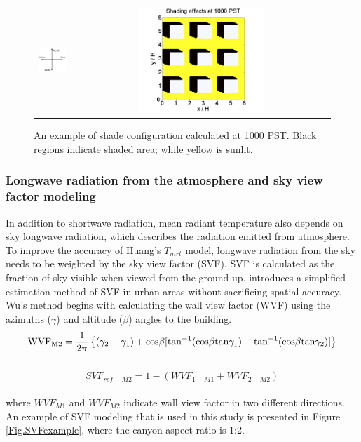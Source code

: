 \documentclass[smallextended]{svjour3}
\begin{document}
\begin{figure}[!h]
\graphicspath{ {image/} }
\begin{tabular}{cc}
   \includegraphics[width=1in]{ESWN.JPG} & \includegraphics[width=0.5\textwidth]{ShadowSample.png}  
\end{tabular}
\caption{An example of shade configuration calculated at 1000 PST. Black regions indicate shaded area; while yellow is sunlit.}
\label{Fig.ShadowExample}
\end{figure}

\subsubsection{Longwave radiation from the atmosphere and sky view factor modeling}
In addition to shortwave radiation, mean radiant temperature also depends on sky longwave radiation, which describes the radiation emitted from atmosphere. To improve the accuracy of Huang's $T_{mrt}$ model, longwave radiation from the sky needs to be weighted by the sky view factor (SVF). SVF is calculated as the fraction of sky visible when viewed from the ground up.  \cite{wu2013calculation} introduces a simplified estimation method of SVF in urban areas without sacrificing spatial accuracy. Wu’s method begins with calculating the wall view factor (WVF) using the azimuths ($\gamma$) and altitude ($\beta$) angles to the building.\\
\begin{equation}
\rm
WVF_{M2}=\frac{1}{2\pi}
\left\{
(\gamma_2-\gamma_1)+cos{\beta}[tan^{-1}(cos{\beta}tan{\gamma_1})-tan^{-1}(cos{\beta}tan\gamma_2)]
\right\}
\end{equation}\\
\begin{equation}
SVF_{ref-M2}=1-(WVF_{1-M1}+WVF_{2-M2})
\end{equation}\\
where $WVF_{M1}$ and $WVF_{M2}$ indicate wall view factor in two different directions. An example of SVF modeling that is used in this study is presented in Figure \ref{Fig.SVFexample}, where the canyon aspect ratio is 1:2. 
\end{document}
